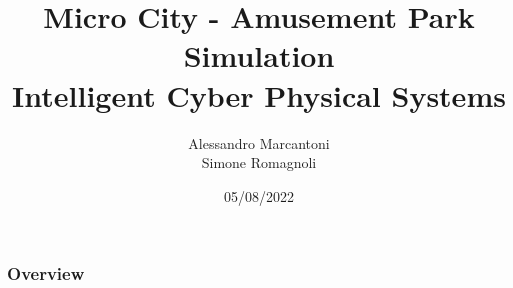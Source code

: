 \documentclass[
    11pt, %
]{beamer}
\title[microcity]{Micro City - Amusement Park Simulation \\ Intelligent Cyber Physical Systems}
\author[Marcantoni, Romagnoli]{Alessandro Marcantoni\\Simone Romagnoli}
\date[05/08/2022]{05/08/2022}
\begin{document}
    \begin{frame}
        \titlepage
    \end{frame}

    \begin{frame}
        \frametitle{Overview}
        \tableofcontents
    \end{frame}

    
    
    
\end{document}
